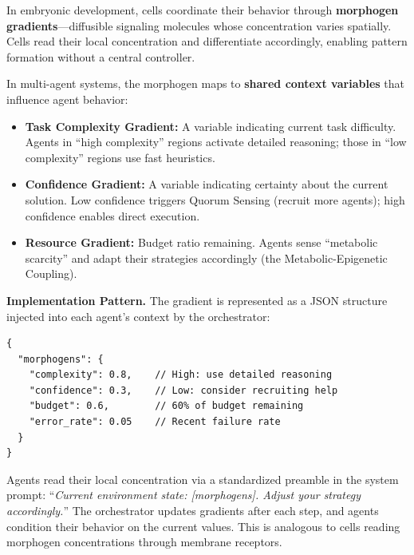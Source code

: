 In embryonic development, cells coordinate their behavior through \textbf{morphogen gradients}---diffusible
signaling molecules whose concentration varies spatially. Cells read their local concentration and differentiate
accordingly, enabling pattern formation without a central controller.

In multi-agent systems, the morphogen maps to \textbf{shared context variables} that influence agent behavior:
\begin{itemize}[leftmargin=*]
\item \textbf{Task Complexity Gradient:} A variable indicating current task difficulty. Agents in ``high
complexity'' regions activate detailed reasoning; those in ``low complexity'' regions use fast heuristics.
\item \textbf{Confidence Gradient:} A variable indicating certainty about the current solution. Low confidence
triggers Quorum Sensing (recruit more agents); high confidence enables direct execution.
\item \textbf{Resource Gradient:} Budget ratio remaining. Agents sense ``metabolic scarcity'' and adapt their
strategies accordingly (the Metabolic-Epigenetic Coupling).
\end{itemize}

\textbf{Implementation Pattern.} The gradient is represented as a JSON structure injected into each agent's
context by the orchestrator:
\begin{verbatim}
{
  "morphogens": {
    "complexity": 0.8,    // High: use detailed reasoning
    "confidence": 0.3,    // Low: consider recruiting help
    "budget": 0.6,        // 60% of budget remaining
    "error_rate": 0.05    // Recent failure rate
  }
}
\end{verbatim}
Agents read their local concentration via a standardized preamble in the system prompt:
``\textit{Current environment state: [morphogens]. Adjust your strategy accordingly.}''
The orchestrator updates gradients after each step, and agents condition their behavior on the current values.
This is analogous to cells reading morphogen concentrations through membrane receptors.

